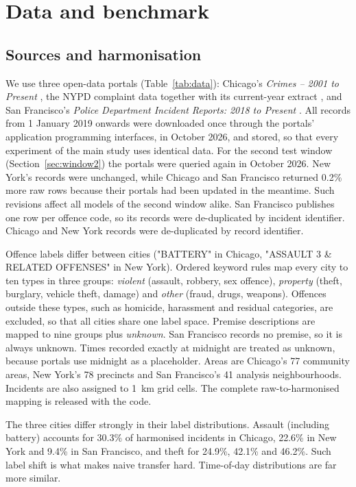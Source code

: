 \documentclass[11pt]{article}
\begin{document}
\section{Data and benchmark}\label{sec:data}

\subsection{Sources and harmonisation}
We use three open-data portals (Table~\ref{tab:data}): Chicago's \emph{Crimes -- 2001 to Present} \citep{chicago2026}, the NYPD complaint data together with its current-year extract \citep{nypd2026historic}, and San Francisco's \emph{Police Department Incident Reports: 2018 to Present} \citep{sfpd2026}. All records from 1 January 2019 onwards were downloaded once through the portals' application programming interfaces, in October 2026, and stored, so that every experiment of the main study uses identical data. For the second test window (Section~\ref{sec:window2}) the portals were queried again in October 2026. New York's records were unchanged, while Chicago and San Francisco returned 0.2\% more raw rows because their portals had been updated in the meantime. Such revisions affect all models of the second window alike. San Francisco publishes one row per offence code, so its records were de-duplicated by incident identifier. Chicago and New York records were de-duplicated by record identifier.

Offence labels differ between cities ("BATTERY" in Chicago, "ASSAULT 3 \& RELATED OFFENSES" in New York). Ordered keyword rules map every city to ten types in three groups: \emph{violent} (assault, robbery, sex offence), \emph{property} (theft, burglary, vehicle theft, damage) and \emph{other} (fraud, drugs, weapons). Offences outside these types, such as homicide, harassment and residual categories, are excluded, so that all cities share one label space. Premise descriptions are mapped to nine groups plus \emph{unknown}. San Francisco records no premise, so it is always unknown. Times recorded exactly at midnight are treated as unknown, because portals use midnight as a placeholder. Areas are Chicago's 77 community areas, New York's 78 precincts and San Francisco's 41 analysis neighbourhoods. Incidents are also assigned to 1~km grid cells. The complete raw-to-harmonised mapping is released with the code.

The three cities differ strongly in their label distributions. Assault (including battery) accounts for 30.3\% of harmonised incidents in Chicago, 22.6\% in New York and 9.4\% in San Francisco, and theft for 24.9\%, 42.1\% and 46.2\%. Such label shift is what makes naive transfer hard. Time-of-day distributions are far more similar.
\end{document}
